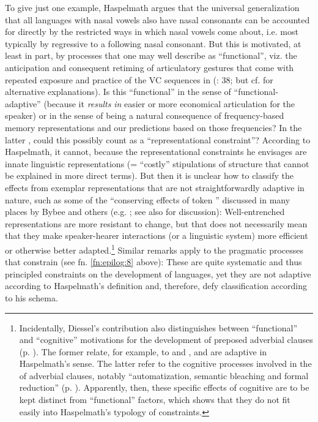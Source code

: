 \documentclass[output=paper]{langsci/langscibook}
\begin{document}
To give just one example, Haspelmath argues that the universal generalization that all languages with nasal vowels also have nasal consonants can be accounted for directly by the restricted ways in which nasal vowels come about, i.e. most typically by regressive  to a following nasal consonant. But this  is motivated, at least in part, by processes that one may well describe as “functional”, viz. the anticipation and consequent retiming of articulatory gestures that come with repeated exposure and practice of the VC sequences in  (\citealt{Bybee2015}: 38; but cf. \citealt{Ohala1989,Ohala2003} for alternative explanations). Is this “functional” in the sense of “functional-adaptive” (because it \textit{results} \textit{in} easier or more economical articulation for the speaker) or in the sense of being a natural consequence of frequency-based memory representations and our predictions based on those frequencies? In the latter , could this possibly count as a “representational constraint”? According to Haspelmath, it cannot, because the representational constraints he envisages are innate linguistic representations (= “costly” stipulations of structure that cannot be explained in more direct terms). But then it is unclear how to classify the  effects from exemplar representations that are not straightforwardly adaptive in nature, such as some of the “conserving effects of token ” discussed in many places by Bybee and others (e.g. \citealt{BybeeThompson1997,Pierrehumbert2001,Bybee2001}; see also \citealt{Cristofaro2015} for discussion): Well-entrenched representations are more resistant to change, but that does not necessarily mean that they make speaker-hearer interactions (or a linguistic system) more efficient or otherwise better adapted.\footnote{Incidentally, Diessel’s contribution also distinguishes between “functional” and “cognitive” motivations for the development of preposed adverbial clauses (p. \pageref{p:diessel:preposedadverbialclauses}). The former relate, for example, to  and , and are adaptive in Haspelmath’s sense. The latter refer to the cognitive processes involved in the  of adverbial clauses, notably “automatization, semantic bleaching and formal reduction” (p. \pageref{p:xxx:automatization}). Apparently, then, these specific effects of cognitive  are to be kept distinct from “functional” factors, which shows that they do not fit easily into Haspelmath’s typology of constraints.}  Similar remarks apply to the pragmatic processes that constrain  (see fn. \ref{fn:epilog:8} above): These are quite systematic and thus principled constraints on the development of languages, yet they are not adaptive according to Haspelmath’s definition and, therefore, defy classification according to his schema.
\end{document}
